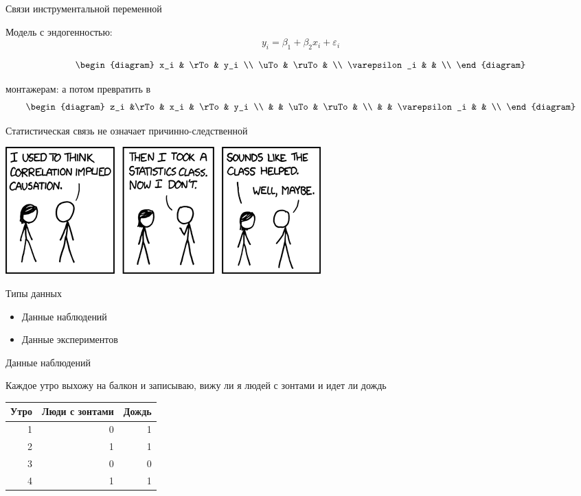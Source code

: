 \documentclass[ignorenonframetext,]{beamer}
\newcommand{\e}{\varepsilon}
\begin{document}
\begin{frame}{Связи инструментальной переменной}

Модель с эндогенностью: \[
y_i = \beta_1 + \beta_2 x_i + \e_i
\]

\[
\begin{diagram}
x_i  & \rTo  & y_i \\
\uTo & \ruTo &     \\
\e_i &       &     \\
\end{diagram}
\]

монтажерам: а потом превратить в \[
\begin{diagram}
z_i &\rTo & x_i  & \rTo  & y_i \\
    &     & \uTo & \ruTo &     \\
    &     & \e_i &       &    \\
\end{diagram}
\]

\end{frame}

\begin{frame}{Статистическая связь не означает причинно-следственной}

\includegraphics{correlation.png}

\end{frame}

\begin{frame}{Типы данных}

\begin{itemize}
\item
  Данные наблюдений
\item
  Данные экспериментов
\end{itemize}

\end{frame}

\begin{frame}{Данные наблюдений}

Каждое утро выхожу на балкон и записываю, вижу ли я людей с зонтами и
идет ли дождь

\begin{longtable}[c]{@{}rrr@{}}
\toprule
Утро & Люди с зонтами & Дождь\tabularnewline
\midrule
\endhead
1 & 0 & 1\tabularnewline
2 & 1 & 1\tabularnewline
3 & 0 & 0\tabularnewline
4 & 1 & 1\tabularnewline
\bottomrule
\end{longtable}

\end{frame}
\end{document}
